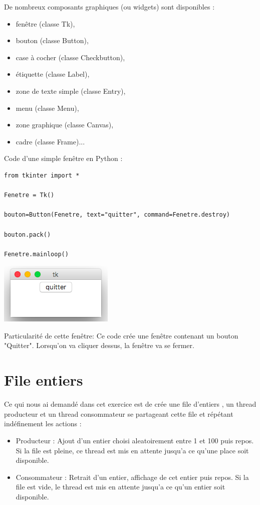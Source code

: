 \documentclass{article}
\begin{document}
De nombreux composants graphiques (ou widgets) sont disponibles : 
\begin{itemize}
\item fenêtre (classe Tk), \item bouton (classe Button), \item case à cocher (classe Checkbutton), \item étiquette (classe Label), \item zone de texte simple (classe Entry), \item menu (classe Menu), \item zone graphique (classe Canvas), \item cadre (classe Frame)...
\end{itemize}

Code d'une simple fenêtre en Python :
\begin{verbatim}
from tkinter import *

Fenetre = Tk()

bouton=Button(Fenetre, text="quitter", command=Fenetre.destroy)

bouton.pack()

Fenetre.mainloop()
\end{verbatim}

\begin{center}
  \includegraphics[scale=0.5]{fenetreP.png}
\end{center}


Particularité de cette fenêtre: Ce code crée une fenêtre contenant un bouton "Quitter". Lorsqu'on va cliquer dessus, la fenêtre va se fermer.

\section{File entiers }

Ce qui nous ai demandé dans cet exercice est de crée une file d'entiers , un thread producteur et un thread consommateur se partageant cette file et répétant indéfinement les actions :
\begin{itemize}
\item Producteur : Ajout d’un entier choisi aleatoirement entre 1 et 100 puis repos. Si la file est pleine, ce thread est mis en attente jusqu’a ce qu’une place soit disponible.
\item Consommateur : Retrait d’un entier, affichage de cet entier puis repos. Si la file est vide, le thread est mis en attente jusqu’a ce qu’un entier soit disponible.
\end{itemize}
\end{document}
